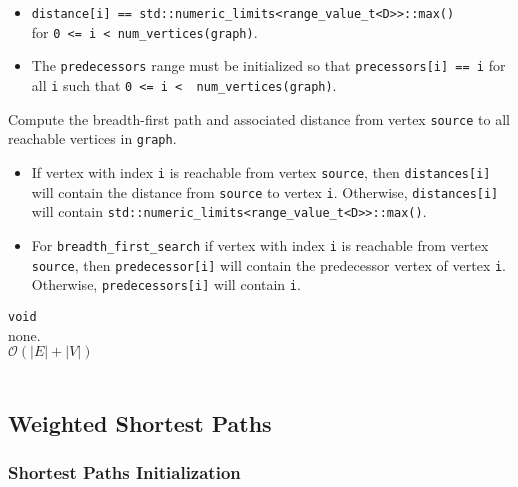\begin{itemdescr}
\begin{itemize}
                  \item
                        \lstinline{distance[i] == std::numeric_limits<range_value_t<D>>::max()} \\
                        for \lstinline{0 <= i < num_vertices(graph)}.  
                  \item
                        The \lstinline{predecessors} range must be initialized so that
                        \lstinline{precessors[i] == i} for all \lstinline{i} such that
                        \lstinline{0 <= i <  num_vertices(graph)}.
            \end{itemize}
      \pnum\effects Compute the breadth-first path and associated distance from vertex
                        \lstinline{source} to all reachable vertices in \lstinline{graph}.
      \pnum\result 
            \begin{itemize}
                  \item If vertex with index \lstinline{i} is reachable from vertex \lstinline{source}, then
                        \lstinline{distances[i]} will contain the distance from \lstinline{source} to vertex
                        \lstinline{i}.  Otherwise, \lstinline{distances[i]} will contain
                        \lstinline{std::numeric_limits<range_value_t<D>>::max()}.
                  \item
                        For \lstinline{breadth_first_search} if vertex with index \lstinline{i} is reachable
                        from vertex \lstinline{source}, then \lstinline{predecessor[i]} will contain the
                        predecessor vertex of vertex \lstinline{i}.  Otherwise, \lstinline{predecessors[i]} 
                        will contain \lstinline{i}.
            \end{itemize}
      \pnum\returns \lstinline{void} \\
      \pnum\throws none.  \\
      \pnum\complexity $\mathcal{O}(|E| + |V|)$ \\
      \pnum\remarks \\
\end{itemdescr}


\subsection{Weighted Shortest Paths}

\subsubsection{Shortest Paths Initialization}

